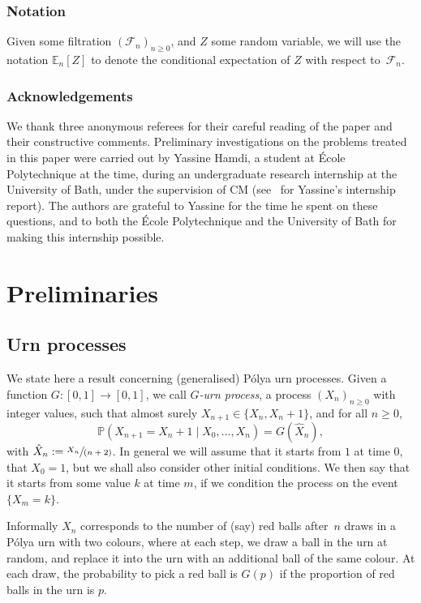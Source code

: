 \documentclass[JEP,XML,SOM,Unicode,NoFloatCountersInSection,published]{cedram}
\let\mathcal\mathscr
\newcommand{\spfrac}[2]{\sfrac{#1}{(#2)}}
\numberwithin{equation}{section}
\theoremstyle{definition}
\begin{document}
\subsubsection*{Notation} Given some filtration $(\mathcal F_n)_{n\ge 0}$, and $Z$ some random variable, we will use the notation $\mathbb E_n[Z]$ to denote the conditional expectation of $Z$ with respect to~$\mathcal F_n$.

\subsubsection*{Acknowledgements}
We thank three anonymous referees for their careful reading of the paper and their constructive comments.
Preliminary investigations on the problems treated in this paper were carried out by Yassine Hamdi,
a student at École Polytechnique at the time,
during an undergraduate research internship at the University of Bath,
under the supervision of CM (see~\cite{Yassine} for Yassine's internship report).
The authors are grateful to Yassine for the time he spent on these questions,
and to both the École Polytechnique and the University of Bath for making this internship possible.

\section{Preliminaries}\label{sec.prelim}

\subsection{Urn processes}
We state here a result concerning (generalised) Pólya urn processes.
Given a function $G:[0,1]\to [0,1]$, we call \emph{$G$-urn process}, a process $(X_n)_{n\ge 0}$ with integer values, such that almost surely $X_{n+1}
\in \{X_n,X_n+1\}$, and for all $n\ge 0$,
\[
\mathbb P(X_{n+1} = X_n +1 \mid X_0,\dots,X_n) = G(\hat X_n),
\]
with $\hat X_n :=\spfrac{X_n}{n+2}$.
In general we will assume that it starts from $1$ at time $0$, \ie that $X_0=1$, but we shall also consider other initial condition{s}.
We then say that it starts from some value $k$ at time $m$, if we condition the process on the event $\{X_m=k\}$.

Informally $X_n$ corresponds
to the number of (say) red balls after~$n$ draws in a Pólya urn with two colours,
where at each step, we draw a ball in the urn at random, and replace it into the urn with an additional ball of the same colour. At each draw, the probability to pick a red ball is $G(p)$
if the proportion of red balls in the urn is $p$.
\end{document}
